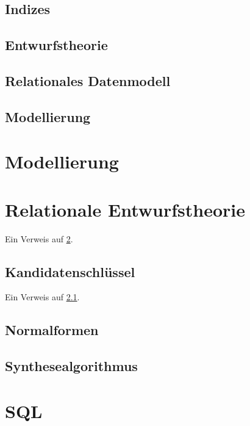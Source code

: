 \documentclass[exam, sectionseven, german]{acAssignment}
\begin{document}
\subsection{Indizes}
\subsection{Entwurfstheorie}
\subsection{Relationales Datenmodell}
\subsection{Modellierung}

\section{Modellierung}

\section{Relationale Entwurfstheorie}
\label{sec:rel-theorie}
Ein Verweis auf \cref{sec:rel-theorie}.

\subsection{Kandidatenschlüssel}
\label{subsec:candidatekey}
Ein Verweis auf \cref{subsec:candidatekey}.


\subsection{Normalformen}


\subsection{Synthesealgorithmus}

\section{SQL}
\end{document}
